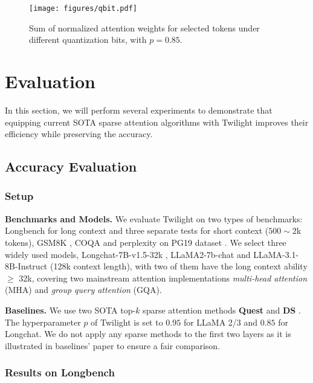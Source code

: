 \begin{figure}[t]
\begin{center}
\centerline{\texttt{[image: figures/qbit.pdf]}}
\caption{Sum of normalized attention weights for selected tokens under different quantization bits, with $p=0.85$.}
\label{fig:qbit}
\end{center}
\end{figure}

\section{Evaluation}

In this section, we will perform several experiments to demonstrate that equipping current SOTA sparse attention algorithms with Twilight improves their efficiency while preserving the accuracy.

\subsection{Accuracy Evaluation}

\subsubsection{Setup}
\textbf{Benchmarks and Models.} We evaluate Twilight on two types of benchmarks: Longbench \cite{bai2024longbench} for long context and three separate tests for short context ($500\sim2$k tokens), GSM8K \cite{cobbe2021training}, COQA \cite{reddy-etal-2019-coqa} and perplexity on PG19 dataset \cite{rae2019compressive}. We select three widely used models, Longchat-7B-v1.5-32k \cite{longchat2023}, LLaMA2-7b-chat \cite{touvron2023llama} and LLaMA-3.1-8B-Instruct \cite{dubey2024llama} (128k context length), with two of them have the long context ability $\ge$ 32k, covering two mainstream attention implementations \textit{multi-head attention} (MHA) and \textit{group
query attention} (GQA).

\textbf{Baselines.} We use two SOTA top-$k$ sparse attention methods \textbf{Quest} \cite{tang2024quest} and \textbf{DS} \cite{yang2024post}. The hyperparameter $p$ of Twilight is set to $0.95$ for LLaMA 2/3 and $0.85$ for Longchat. We do not apply any sparse methods to the first two layers as it is illustrated in baselines' paper to ensure a fair comparison.

\subsubsection{Results on Longbench}


